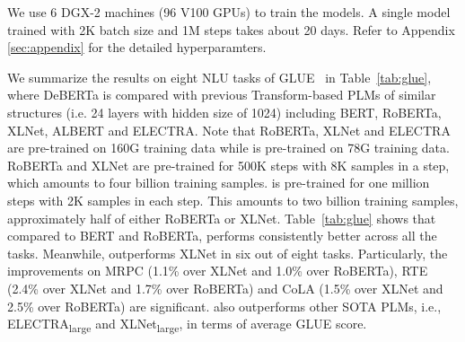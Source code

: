 We use 6 DGX-2 machines (96 V100 GPUs) to train the models. 
A single model trained with 2K batch size and 1M steps takes about 20 days.
Refer to Appendix \ref{sec:appendix} for the detailed hyperparamters. 

We summarize the results on eight NLU tasks of GLUE~\citep{wang2018glue} in Table~\ref{tab:glue}, where DeBERTa is compared {\ModelName} with previous Transform-based PLMs of similar structures (i.e. 24 layers with hidden size of 1024) including BERT, RoBERTa, XLNet, ALBERT and ELECTRA.
Note that RoBERTa, XLNet and ELECTRA are pre-trained on 160G training data while {\ModelName} is pre-trained on 78G training data. RoBERTa and XLNet are pre-trained for 500K steps with 8K samples in a step, which amounts to four billion training samples. 
{\ModelName} is pre-trained for one million steps with 2K samples in each step.  
This amounts to two billion training samples, approximately half of either RoBERTa or XLNet.  
Table~\ref{tab:glue} shows that compared to BERT and RoBERTa, {\ModelName} performs consistently better across all the tasks. 
Meanwhile, {\ModelName} outperforms XLNet in six out of eight tasks. 
Particularly, the improvements on MRPC (1.1\% over XLNet and 1.0\% over RoBERTa), RTE (2.4\% over XLNet and 1.7\% over RoBERTa) and CoLA (1.5\% over XLNet and 2.5\% over RoBERTa) are significant. 
{\ModelName} also outperforms other SOTA PLMs, i.e., ELECTRA\textsubscript{large} and XLNet\textsubscript{large}, in terms of average GLUE score.  

